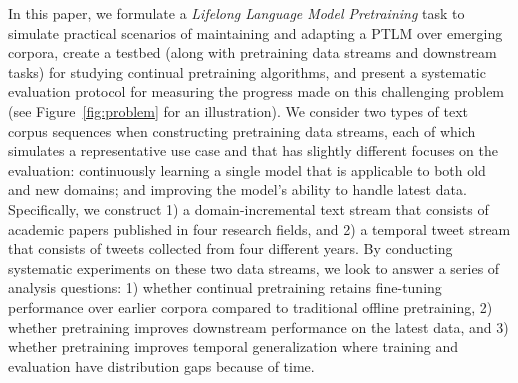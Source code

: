 In this paper, we formulate a \textit{Lifelong Language Model Pretraining} task to simulate practical scenarios of maintaining and adapting a PTLM over emerging corpora, create a testbed (along with pretraining data streams and downstream tasks) for studying continual pretraining algorithms, and present a systematic evaluation protocol for measuring the progress made on this challenging problem (see Figure~\ref{fig:problem} for an illustration). 
We consider two types of text corpus sequences when constructing pretraining data streams, each of which simulates a representative use case and that has slightly different focuses on the evaluation: continuously learning a single model that is applicable to both old and new domains; and improving the model's ability to handle latest data.
Specifically, we construct
1) a domain-incremental text stream that consists of academic papers published in four research fields, and
2) a temporal tweet stream that consists of tweets collected from four different years.
By conducting systematic experiments on these two data streams,
we look to answer a series of analysis questions: 1) whether continual pretraining retains fine-tuning performance over earlier corpora compared to traditional offline pretraining, 2) whether pretraining improves downstream performance on the latest data, and 3) whether pretraining improves temporal generalization where training and evaluation have distribution gaps because of time.
